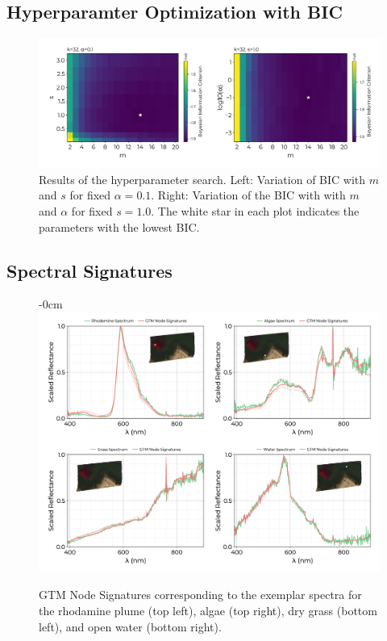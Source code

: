 \documentclass[remotesensing,article,submit,pdftex,moreauthors]{Definitions/mdpi}
\begin{document}
\subsection{Hyperparamter Optimization with BIC}


\begin{figure}[t]
\centering
\includegraphics[width=\textwidth]{paper/figures/results/bic.pdf}
\caption{Results of the hyperparameter search. Left: Variation of BIC with $m$ and $s$ for fixed $\alpha=0.1$. Right: Variation of the BIC with with $m$ and $\alpha$ for fixed $s=1.0$. The white star in each plot indicates the parameters with the lowest BIC.\label{fig:hp-results}}
\end{figure}  


\subsection{Spectral Signatures}


\begin{figure}[t]
\begin{adjustwidth}{-\extralength}{0cm}
\centering
\includegraphics[width=15.5cm]{paper/figures/results/spectral-signatures.png}
\end{adjustwidth}
\caption{GTM Node Signatures corresponding to the exemplar spectra for the rhodamine plume (top left), algae (top right), dry grass (bottom left), and open water (bottom right). \label{fig:spectral-signautes}}
\end{figure}  
\end{document}
